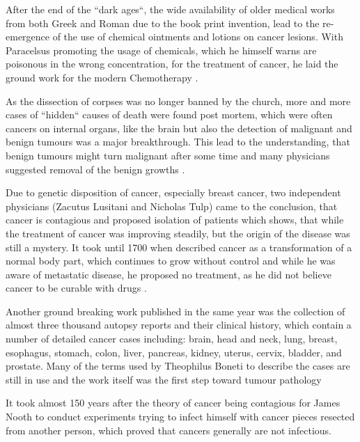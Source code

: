 After the end of the ``dark ages``, the wide availability of older medical works from both Greek and Roman due to the book print invention, lead to the re-emergence of the use of chemical ointments and lotions on cancer lesions. With Paracelsus promoting the usage of chemicals, which he himself warns are poisonous in the wrong concentration, for the treatment of cancer, he laid the ground work for the modern Chemotherapy \cite{PHT1562}.

As the dissection of corpses was no longer banned by the church, more and more cases of ``hidden`` causes of death were found post mortem, which were often cancers on internal organs, like the brain but also the detection of malignant and benign tumours was a major breakthrough. This lead to the understanding, that  benign tumours might turn malignant after some time and many physicians suggested removal of the benign growths \cite{Severino1632}.

Due to genetic disposition of cancer, especially breast cancer, two independent physicians (Zacutus Lusitani and Nicholas Tulp) came to the conclusion, that cancer is contagious and proposed isolation of patients \cite{Lusitani1649,Tulpii1652} which shows, that while the treatment of cancer was improving steadily, but the origin of the disease was still a mystery. It took until 1700 when \citeauthor{DeshaiesGendron1701} described cancer as a transformation of a normal body part, which continues to grow without control and while he was aware of metastatic disease, he proposed no treatment, as he did not believe cancer to be curable with drugs \cite{DeshaiesGendron1701}. 

Another ground breaking work published in the same year was the collection of almost three thousand autopsy reports and their clinical history, which contain a number of detailed cancer cases including: brain, head and neck, lung, breast, esophagus, stomach, colon, liver, pancreas, kidney, uterus, cervix, bladder, and prostate. Many of the terms used by Theophilus Boneti to describe the cases are still in use and the work itself was the first step toward tumour pathology \cite{Hajdu2010a}

It took almost 150 years after the theory of cancer being contagious for James Nooth to conduct experiments trying to infect himself with cancer pieces resected from another person, which proved that cancers generally are not infectious\cite{Nooth1804}.


